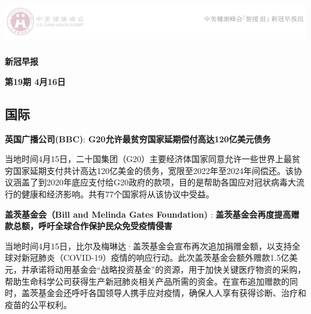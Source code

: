 \documentclass[
]{article}
\author{}
\date{\vspace{-2.5em}}
\begin{document}
\fontsize{22}{22}
\selectfont
\vspace{-10truemm}

\newcommand{\resheading}[1]{%
  \noindent\fcolorbox{lavenderblush}{lavenderblush}{\makebox[\dimexpr\textwidth-2\fboxsep-2\fboxrule][l]{\textbf{~#1}}}%
}

\begin{center}
\includegraphics[height=2cm]{./input/logo2.png} 
\end{center}

\begin{center}
\fontsize{45}{45}
\textcolor{glaucous}{\textbf{新冠早报}}
\end{center}

\begin{center}
\fontsize{22}{22}
{\textcolor{glaucous}{\textbf{第19期 \space 4月16日}}}
\end{center}

%
  \noindent{}%

\hypertarget{section}{%
\subsection{\texorpdfstring{\textcolor{glaucous}{\Huge 国际}}{}}\label{section}}

\textbf{\textcolor{glaucous}{英国广播公司(BBC)}}:
\textbf{G20允许最贫穷国家延期偿付高达120亿美元债务 }

当地时间4月15日，二十国集团（G20）主要经济体国家同意允许一些世界上最贫穷国家延期支付共计高达120亿美金的债务，宽限至2022年至2024年间偿还。该协议涵盖了到2020年底应支付给G20政府的款项，目的是帮助各国应对冠状病毒大流行的健康和经济影响。共有77个国家将从该协议中受益。

\textbf{\textcolor{glaucous}{盖茨基金会（Bill and Melinda Gates Foundation)}}
: \textbf{盖茨基金会再度提高赠款总额，呼吁全球合作保护民众免受疫情侵害}

当地时间4月15日，比尔及梅琳达·盖茨基金会宣布再次追加捐赠金额，以支持全球对新冠肺炎（COVID-19）疫情的响应行动。此次盖茨基金会额外赠款1.5亿美元，并承诺将动用基金会``战略投资基金''的资源，用于加快关键医疗物资的采购，帮助生命科学公司获得生产新冠肺炎相关产品所需的资金。在宣布追加赠款的同时，盖茨基金会还呼吁各国领导人携手应对疫情，确保人人享有获得诊断、治疗和疫苗的公平权利。
\end{document}
